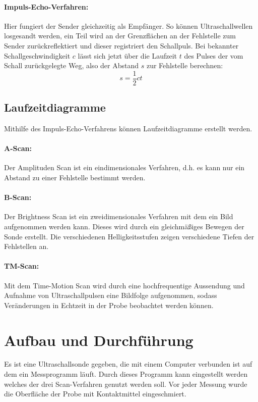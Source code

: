 \documentclass[titlepage = firstcover]{scrartcl}
\begin{document}
        \paragraph{Impuls-Echo-Verfahren:}
          Hier fungiert der Sender gleichzeitig als Empfänger. So können Ultraschallwellen losgesandt werden, ein Teil wird an der Grenzflächen an der Fehlstelle zum Sender zurückreflektiert und dieser registriert den Schallpuls.
          Bei bekannter Schallgeschwindigkeit $c$ lässt sich jetzt über die Laufzeit $t$ des Pulses der vom Schall zurückgelegte Weg, also der Abstand $s$ zur Fehlstelle berechnen:
          \begin{equation*}
            s = \frac{1}{2}ct
          \end{equation*}

      \subsection{Laufzeitdiagramme}
        Mithilfe des Impuls-Echo-Verfahrens können Laufzeitdiagramme erstellt werden.
        \paragraph{A-Scan:}
          Der Amplituden Scan ist ein eindimensionales Verfahren, d.h. es kann nur ein Abstand zu einer Fehlstelle bestimmt werden.
        \paragraph{B-Scan:}
          Der Brightness Scan ist ein zweidimensionales Verfahren mit dem ein Bild aufgenommen werden kann. Dieses wird durch ein gleichmäßiges Bewegen der Sonde erstellt. Die verschiedenen Helligkeitsstufen zeigen verschiedene Tiefen der Fehlstellen an.
        \paragraph{TM-Scan:}
          Mit dem Time-Motion Scan wird durch eine hochfrequentige Aussendung und Aufnahme von Ultraschallpulsen eine Bildfolge aufgenommen, sodass Veränderungen in Echtzeit in der Probe beobachtet werden können.

    \section{Aufbau und Durchführung}
        Es ist eine Ultraschallsonde gegeben, die mit einem Computer verbunden ist auf dem ein Messprogramm läuft. Durch dieses Programm kann eingestellt werden welches der drei Scan-Verfahren genutzt werden soll. Vor jeder Messung wurde die Oberfläche der Probe mit Kontaktmittel eingeschmiert.
\end{document}
